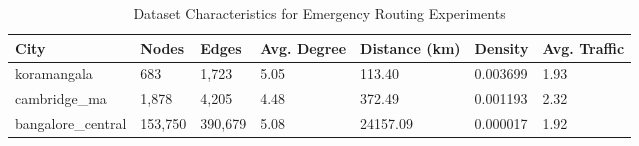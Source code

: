 \begin{table}
\caption{Dataset Characteristics for Emergency Routing Experiments}
\label{tab:datasets}
\begin{tabular}{lllllll}
\toprule
City & Nodes & Edges & Avg. Degree & Distance (km) & Density & Avg. Traffic \\
\midrule
koramangala & 683 & 1,723 & 5.05 & 113.40 & 0.003699 & 1.93 \\
cambridge_ma & 1,878 & 4,205 & 4.48 & 372.49 & 0.001193 & 2.32 \\
bangalore_central & 153,750 & 390,679 & 5.08 & 24157.09 & 0.000017 & 1.92 \\
\bottomrule
\end{tabular}
\end{table}

